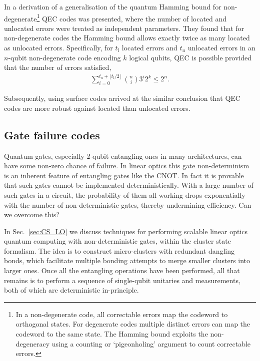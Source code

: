 In \cite{bib:RohdeHaselgrove} a derivation of a generalisation of the quantum Hamming bound for non-degenerate\footnote{In a non-degenerate code, all correctable errors map the codeword to orthogonal states. For degenerate codes multiple distinct errors can map the codeword to the same state. The Hamming bound exploits the non-degeneracy using a counting or `pigeonholing' argument to count correctable errors.} QEC codes was presented, where the number of located and unlocated errors were treated as independent parameters. They found that for non-degenerate codes the Hamming bound allows exactly twice as many located as unlocated errors. Specifically, for $t_l$ located errors and $t_u$ unlocated errors in an $n$-qubit non-degenerate code encoding $k$ logical qubits, QEC is possible provided that the number of errors satisfied,
\begin{align}
\sum_{i=0}^{t_u + \lfloor t_l/2 \rfloor} \binom{n}{i}3^i 2^k \leq 2^n.
\end{align}

Subsequently, using surface codes \cite{bib:StaceBarrettDohertyLoss} arrived at the similar conclusion that QEC codes are more robust against located than unlocated errors.

%
%

\subsection{Gate failure codes}

Quantum gates, especially 2-qubit entangling ones in many architectures, can have some non-zero chance of failure. In linear optics this gate non-determinism is an inherent feature of entangling gates like the CNOT. In fact it is provable that such gates cannot be implemented deterministically. With a large number of such gates in a circuit, the probability of them all working drops exponentially with the number of non-deterministic gates, thereby undermining efficiency. Can we overcome this?

In Sec.~\ref{sec:CS_LO} we discuss techniques for performing scalable linear optics quantum computing with non-deterministic gates, within the cluster state formalism. The idea is to construct micro-clusters with redundant dangling bonds, which facilitate multiple bonding attempts to merge smaller clusters into larger ones. Once all the entangling operations have been performed, all that remains is to perform a sequence of single-qubit unitaries and measurements, both of which are deterministic in-principle.

